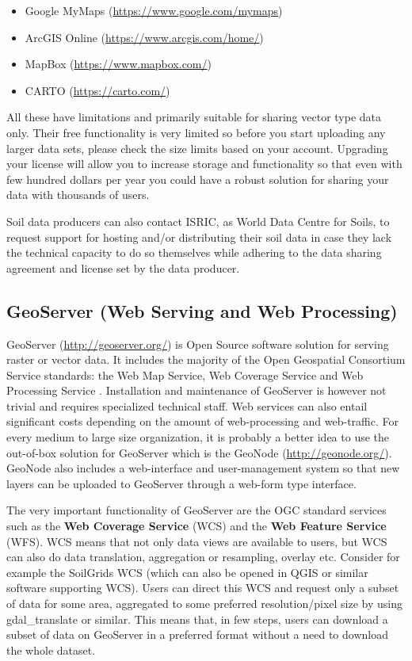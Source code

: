 \documentclass[10pt,b5paper,]{book}
\providecommand{\tightlist}{%
  \setlength{\itemsep}{0pt}\setlength{\parskip}{0pt}}
\theoremstyle{definition}
\theoremstyle{definition}
\theoremstyle{definition}
\theoremstyle{remark}
\begin{document}
\begin{itemize}
\tightlist
\item
  Google MyMaps (\url{https://www.google.com/mymaps})
\item
  ArcGIS Online (\url{https://www.arcgis.com/home/})
\item
  MapBox (\url{https://www.mapbox.com/})
\item
  CARTO (\url{https://carto.com/})
\end{itemize}

All these have limitations and primarily suitable for sharing vector
type data only. Their free functionality is very limited so before you
start uploading any larger data sets, please check the size limits based
on your account. Upgrading your license will allow you to increase
storage and functionality so that even with few hundred dollars per year
you could have a robust solution for sharing your data with thousands of
users.

Soil data producers can also contact ISRIC, as World Data Centre for
Soils, to request support for hosting and/or distributing their soil
data in case they lack the technical capacity to do so themselves while
adhering to the data sharing agreement and license set by the data
producer.

\hypertarget{geoserver-web-serving-and-web-processing}{%
\subsection{GeoServer (Web Serving and Web
Processing)}\label{geoserver-web-serving-and-web-processing}}

GeoServer (\url{http://geoserver.org/}) is Open Source software solution
for serving raster or vector data. It includes the majority of the Open
Geospatial Consortium Service standards: the Web Map Service, Web
Coverage Service and Web Processing Service
\citep{youngblood2013geoserver}. Installation and maintenance of
GeoServer is however not trivial and requires specialized technical
staff. Web services can also entail significant costs depending on the
amount of web-processing and web-traffic. For every medium to large size
organization, it is probably a better idea to use the out-of-box
solution for GeoServer which is the GeoNode (\url{http://geonode.org/}).
GeoNode also includes a web-interface and user-management system so that
new layers can be uploaded to GeoServer through a web-form type
interface.

The very important functionality of GeoServer are the OGC standard
services such as the \textbf{Web Coverage Service} (WCS) and the
\textbf{Web Feature Service} (WFS). WCS means that not only data views
are available to users, but WCS can also do data translation,
aggregation or resampling, overlay etc. Consider for example the
SoilGrids WCS (which can also be opened in QGIS or similar software
supporting WCS). Users can direct this WCS and request only a subset of
data for some area, aggregated to some preferred resolution/pixel size
by using gdal\_translate or similar. This means that, in few steps,
users can download a subset of data on GeoServer in a preferred format
without a need to download the whole dataset.
\end{document}
